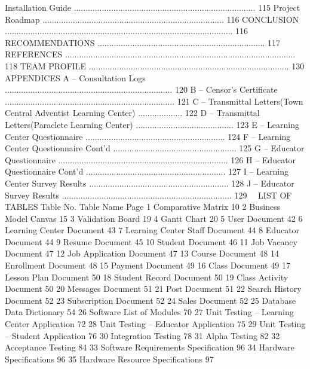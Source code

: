 Installation Guide     ..............................................................................	       115
		Project Roadmap      ..............................................................................	       116
CONCLUSION		..................................................................................................	       116
RECOMMENDATIONS		........................................................................	       117
REFERENCES 		................................................................................................... 	       118
TEAM PROFILE	 	...................................................................................... 	       130
APPENDICES 	  
	A – Consultation Logs		........................................................................ 	       120
B – Censor’s Certificate 	......................................................................... 	       121
     	C – Transmittal Letters(Town Central Adventist Learning Center) ...................            122
D – Transmittal Letters(Paraclete Learning Center)  .......................................... 	       123
E – Learning Center Questionnaire 	............................................................ 	       124
F – Learning Center Questionnaire Cont’d    ..................................................... 	       125
G – Educator Questionnaire 	......................................................................... 	       126
H – Educator Questionnaire Cont’d	............................................................ 	       127
I – Learning Center Survey Results 	............................................................ 	       128
J – Educator Survey Results 	......................................................................... 	       129 
LIST OF TABLES
Table No.  	Table Name	Page
1	Comparative Matrix	10
2	Business Model Canvas	15
3	Validation Board	19
4	Gantt Chart	20
5	User Document	42
6	Learning Center Document	43
7	Learning Center Staff Document	44
8	Educator Document	44
9	Resume Document	45
10	Student Document	46
11	Job Vacancy Document	47
12	Job Application Document	47
13	Course Document	48
14	Enrollment Document	48
15	Payment Document	49
16	Class Document	49
17	Lesson Plan Document	50
18	Student Record Document	50
19	Class Activity Document	50
20	Messages Document 	51
21	Post Document 	51
22	Search History Document	52
23	Subscription Document 	52
24	Sales Document 	52
25	Database Data Dictionary	54
26	Software List of Modules 	70
27	Unit Testing – Learning Center Application	72
28	Unit Testing – Educator Application	75
29	Unit Testing – Student Application 	76
30	Integration Testing	78
31	Alpha Testing	82
32	Acceptance Testing	84
33	Software Requirements Specification	96
34	Hardware Specifications	96
35	Hardware Resource Specifications	97

